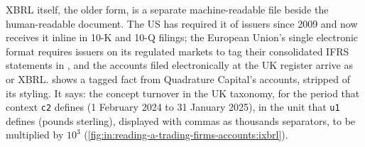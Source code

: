 XBRL itself, the older form, is a separate machine-readable file beside the human-readable document. The US has
required it of issuers since 2009 and now receives it inline in 10-K and 10-Q filings; the European Union's single
electronic format requires issuers on its regulated markets to tag their consolidated IFRS statements in ,
and the accounts filed electronically at the UK register arrive as  or XBRL. 
shows a tagged fact from Quadrature Capital's accounts, stripped of its styling.
\label{lst:in:reading-a-trading-firms-accounts:tag}
It says: the concept turnover in the UK taxonomy, for the period that context \texttt{c2} defines (1 February 2024 to
31 January 2025), in the unit that \texttt{u1} defines (pounds sterling), displayed with commas as thousands
separators, to be multiplied by $10^3$ (\cref{fig:in:reading-a-trading-firms-accounts:ixbrl}).

